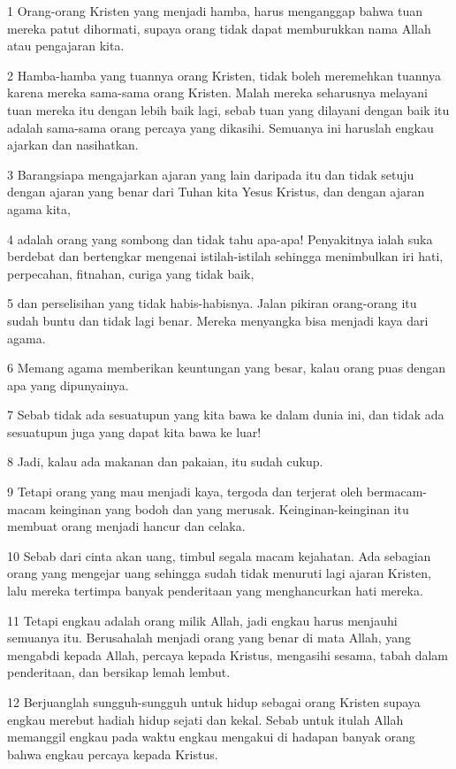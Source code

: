 \par 1 Orang-orang Kristen yang menjadi hamba, harus menganggap bahwa tuan mereka patut dihormati, supaya orang tidak dapat memburukkan nama Allah atau pengajaran kita.
\par 2 Hamba-hamba yang tuannya orang Kristen, tidak boleh meremehkan tuannya karena mereka sama-sama orang Kristen. Malah mereka seharusnya melayani tuan mereka itu dengan lebih baik lagi, sebab tuan yang dilayani dengan baik itu adalah sama-sama orang percaya yang dikasihi. Semuanya ini haruslah engkau ajarkan dan nasihatkan.
\par 3 Barangsiapa mengajarkan ajaran yang lain daripada itu dan tidak setuju dengan ajaran yang benar dari Tuhan kita Yesus Kristus, dan dengan ajaran agama kita,
\par 4 adalah orang yang sombong dan tidak tahu apa-apa! Penyakitnya ialah suka berdebat dan bertengkar mengenai istilah-istilah sehingga menimbulkan iri hati, perpecahan, fitnahan, curiga yang tidak baik,
\par 5 dan perselisihan yang tidak habis-habisnya. Jalan pikiran orang-orang itu sudah buntu dan tidak lagi benar. Mereka menyangka bisa menjadi kaya dari agama.
\par 6 Memang agama memberikan keuntungan yang besar, kalau orang puas dengan apa yang dipunyainya.
\par 7 Sebab tidak ada sesuatupun yang kita bawa ke dalam dunia ini, dan tidak ada sesuatupun juga yang dapat kita bawa ke luar!
\par 8 Jadi, kalau ada makanan dan pakaian, itu sudah cukup.
\par 9 Tetapi orang yang mau menjadi kaya, tergoda dan terjerat oleh bermacam-macam keinginan yang bodoh dan yang merusak. Keinginan-keinginan itu membuat orang menjadi hancur dan celaka.
\par 10 Sebab dari cinta akan uang, timbul segala macam kejahatan. Ada sebagian orang yang mengejar uang sehingga sudah tidak menuruti lagi ajaran Kristen, lalu mereka tertimpa banyak penderitaan yang menghancurkan hati mereka.
\par 11 Tetapi engkau adalah orang milik Allah, jadi engkau harus menjauhi semuanya itu. Berusahalah menjadi orang yang benar di mata Allah, yang mengabdi kepada Allah, percaya kepada Kristus, mengasihi sesama, tabah dalam penderitaan, dan bersikap lemah lembut.
\par 12 Berjuanglah sungguh-sungguh untuk hidup sebagai orang Kristen supaya engkau merebut hadiah hidup sejati dan kekal. Sebab untuk itulah Allah memanggil engkau pada waktu engkau mengakui di hadapan banyak orang bahwa engkau percaya kepada Kristus.
